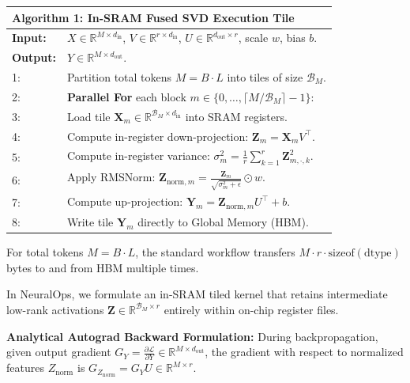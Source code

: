 \documentclass[10pt,twocolumn,letterpaper]{article}
\begin{document}
\begin{table}[h]
\centering
\small
\begin{tabularx}{\columnwidth}{lX}
\toprule
\multicolumn{2}{l}{\textbf{Algorithm 1: In-SRAM Fused SVD Execution Tile}} \\
\midrule
\textbf{Input:} & $X \in \mathbb{R}^{M \times d_{\text{in}}}$, $V \in \mathbb{R}^{r \times d_{\text{in}}}$, $U \in \mathbb{R}^{d_{\text{out}} \times r}$, scale $w$, bias $b$. \\
\textbf{Output:} & $Y \in \mathbb{R}^{M \times d_{\text{out}}}$. \\
\midrule
1: & Partition total tokens $M = B \cdot L$ into tiles of size $\mathcal{B}_M$. \\
2: & \textbf{Parallel For} each block $m \in \{0, \dots, \lceil M / \mathcal{B}_M \rceil - 1\}$: \\
3: & \quad Load tile $\mathbf{X}_m \in \mathbb{R}^{\mathcal{B}_M \times d_{\text{in}}}$ into SRAM registers. \\
4: & \quad Compute in-register down-projection: $\mathbf{Z}_m = \mathbf{X}_m V^\top$. \\
5: & \quad Compute in-register variance: $\sigma_m^2 = \frac{1}{r} \sum_{k=1}^r \mathbf{Z}_{m, \cdot, k}^2$. \\
6: & \quad Apply RMSNorm: $\mathbf{Z}_{\text{norm}, m} = \frac{\mathbf{Z}_m}{\sqrt{\sigma_m^2 + \epsilon}} \odot w$. \\
7: & \quad Compute up-projection: $\mathbf{Y}_m = \mathbf{Z}_{\text{norm}, m} U^\top + b$. \\
8: & \quad Write tile $\mathbf{Y}_m$ directly to Global Memory (HBM). \\
\bottomrule
\end{tabularx}
\end{table}

For total tokens $M = B \cdot L$, the standard workflow transfers $M \cdot r \cdot \text{sizeof}(\text{dtype})$ bytes to and from HBM multiple times.

In NeuralOps, we formulate an in-SRAM tiled kernel that retains intermediate low-rank activations $\mathbf{Z} \in \mathbb{R}^{\mathcal{B}_M \times r}$ entirely within on-chip register files.

\textbf{Analytical Autograd Backward Formulation:} During backpropagation, given output gradient $G_Y = \frac{\partial \mathcal{L}}{\partial Y} \in \mathbb{R}^{M \times d_{\text{out}}}$, the gradient with respect to normalized features $Z_{\text{norm}}$ is $G_{Z_{\text{norm}}} = G_Y U \in \mathbb{R}^{M \times r}$.
\end{document}
